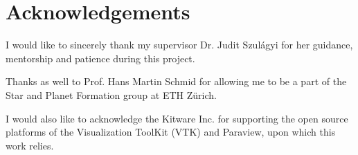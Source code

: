 \documentclass[preprint2]{aastex62}
\newcommand\aastex{AAS\TeX}
\begin{document}
\section{Acknowledgements}
I would like to sincerely thank my supervisor Dr. Judit Szul\'{a}gyi for her guidance, mentorship and patience during this project.

Thanks as well to Prof. Hans Martin Schmid for allowing me to be a part of the Star and Planet Formation group at ETH Z\"{u}rich.

I would also like to acknowledge the Kitware Inc. for supporting the open source platforms of the Visualization ToolKit (VTK)  and Paraview, upon which this work relies.

 






\end{document}
